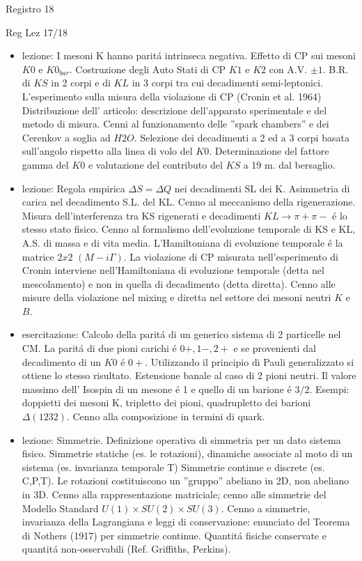 \begin{frame}{Registro 18}
\begin{frame}[allowframebreaks]{Reg Lez 17/18}
\begin{itemize}
\item lezione: I mesoni K hanno parit\'a intrinseca negativa. Effetto di CP sui mesoni $K0$ e $K0_{bar}$. Costruzione degli Auto Stati di CP $K1$ e $K2$ con A.V. $\pm1$. B.R. di $KS$ in 2 corpi e di $KL$ in 3 corpi tra cui decadimenti semi-leptonici. L'esperimento sulla misura della violazione di CP (Cronin et al. 1964) Distribuzione dell' articolo: descrizione dell'apparato sperimentale e del metodo di misura. Cenni al funzionamento delle ''spark chambers'' e dei Cerenkov a soglia ad $H2O$. Selezione dei decadimenti a 2 ed a 3 corpi basata sull'angolo rispetto alla linea di volo del $K0$. Determinazione del fattore gamma del $K0$ e valutazione del contributo del $KS$ a 19 m. dal bersaglio.

\item lezione: Regola empirica $\Delta S=\Delta Q$ nei decadimenti SL dei K. Asimmetria di carica nel decadimento S.L. del KL. Cenno al meccanismo della rigenerazione. Misura dell'interferenza tra KS rigenerati e decadimenti $KL\to\pi+\pi-$ \'e lo stesso stato fisico. Cenno al formalismo dell'evoluzione temporale di KS e KL, A.S. di massa e di vita media. L'Hamiltoniana di evoluzione temporale \'e la matrice $2x2$ $(M-i\Gamma)$. La violazione di CP misurata nell'esperimento di Cronin interviene nell'Hamiltoniana di evoluzione temporale (detta nel mescolamento) e non in quella di decadimento (detta diretta). Cenno alle misure della violazione nel mixing e diretta nel settore dei mesoni neutri $K$ e $B$. 

\item esercitazione: Calcolo della parit\'a di un generico sistema di 2 particelle nel CM. La parit\'a di due pioni carichi \'e $0+,1-,2+$ e se provenienti dal decadimento di un $K0$ \'e $0+$. Utilizzando il principio di Pauli generalizzato si ottiene lo stesso risultato. Estensione banale al caso di 2 pioni neutri. Il valore massimo dell' Isospin di un mesone \'e 1 e quello di un barione \'e $3/2$. Esempi: doppietti dei mesoni K, tripletto dei pioni, quadrupletto dei barioni $\Delta(1232)$. Cenno alla composizione in termini di quark.

\item lezione: Simmetrie. Definizione operativa di simmetria per un dato sistema fisico. Simmetrie statiche (es. le rotazioni), dinamiche associate al moto di un sistema (es. invarianza temporale T) Simmetrie continue e discrete (es. C,P,T). Le rotazioni costituiscono un ''gruppo'' abeliano in 2D, non abeliano in 3D. Cenno alla rappresentazione matriciale; cenno alle simmetrie del Modello Standard $U(1)\times SU(2)\times SU(3)$. Cenno a simmetrie, invarianza della Lagrangiana e leggi di conservazione: enunciato del Teorema di N\:others (1917) per simmetrie continue. Quantit\'a fisiche conservate e quantit\'a non-osservabili (Ref. Griffiths, Perkins).


\end{itemize}
\end{frame}
\end{frame}
